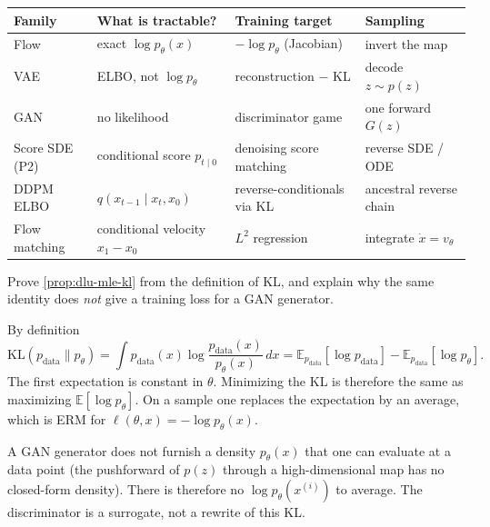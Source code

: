 \begin{center}
{\footnotesize
\begin{tabularx}{\linewidth}{|p{2.4cm}|X|X|X|}
\hline
\textbf{Family} & \textbf{What is tractable?} & \textbf{Training target} & \textbf{Sampling} \\ \hline
Flow & exact \(\log p_\theta(x)\) & \(-\log p_\theta\) (Jacobian) & invert the map \\ \hline
VAE & ELBO, not \(\log p_\theta\) & reconstruction \(-\) KL & decode \(z\sim p(z)\) \\ \hline
GAN & no likelihood & discriminator game & one forward \(G(z)\) \\ \hline
Score SDE (P2) & conditional score \(p_{t\mid 0}\) & denoising score matching & reverse SDE / ODE \\ \hline
DDPM ELBO & \(q(x_{t-1}\mid x_t,x_0)\) & reverse-conditionals via KL & ancestral reverse chain \\ \hline
Flow matching & conditional velocity \(x_1-x_0\) & \(L^2\) regression & integrate \(\dot x=v_\theta\) \\ \hline
\end{tabularx}
}
\end{center}

\begin{exercise}
\label{ex:dlu-mle}
Prove \cref{prop:dlu-mle-kl} from the definition of KL, and explain why the same identity does \emph{not} give a training loss for a GAN generator.
\end{exercise}

\begin{solution}
By definition
\[
\mathrm{KL}(p_{\mathrm{data}}\|p_\theta)
=
\int p_{\mathrm{data}}(x)\log\frac{p_{\mathrm{data}}(x)}{p_\theta(x)}\,dx
=
\mathbb{E}_{p_{\mathrm{data}}}[\log p_{\mathrm{data}}]
-
\mathbb{E}_{p_{\mathrm{data}}}[\log p_\theta].
\]
The first expectation is constant in \(\theta\). Minimizing the KL is therefore the same as maximizing \(\mathbb{E}[\log p_\theta]\). On a sample one replaces the expectation by an average, which is ERM for \(\ell(\theta,x)=-\log p_\theta(x)\).

A GAN generator does not furnish a density \(p_\theta(x)\) that one can evaluate at a data point (the pushforward of \(p(z)\) through a high-dimensional map has no closed-form density). There is therefore no \(\log p_\theta(x^{(i)})\) to average. The discriminator is a surrogate, not a rewrite of this KL.
\end{solution}

